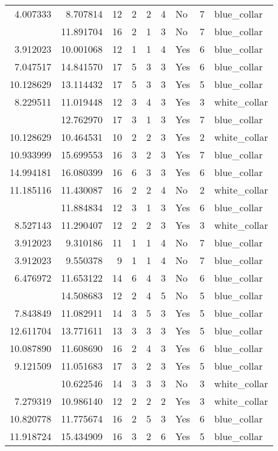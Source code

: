 \documentclass[
]{article}
\begin{document}
\begin{longtable}[t]{rrrrrllrl}
4.007333 & 8.707814 & 12 & 2 & 2 & 4 & No & 7 & blue\_collar\\
\addlinespace
3.912023 & 11.891704 & 16 & 2 & 1 & 3 & No & 7 & blue\_collar\\
3.912023 & 10.001068 & 12 & 1 & 1 & 4 & Yes & 6 & blue\_collar\\
7.047517 & 14.841570 & 17 & 5 & 3 & 3 & Yes & 6 & blue\_collar\\
10.128629 & 13.114432 & 17 & 5 & 3 & 3 & Yes & 5 & blue\_collar\\
8.229511 & 11.019448 & 12 & 3 & 4 & 3 & Yes & 3 & white\_collar\\
\addlinespace
3.912023 & 12.762970 & 17 & 3 & 1 & 3 & Yes & 7 & blue\_collar\\
10.128629 & 10.464531 & 10 & 2 & 2 & 3 & Yes & 2 & white\_collar\\
10.933999 & 15.699553 & 16 & 3 & 2 & 3 & Yes & 7 & blue\_collar\\
14.994181 & 16.080399 & 16 & 6 & 3 & 3 & Yes & 6 & blue\_collar\\
11.185116 & 11.430087 & 16 & 2 & 2 & 4 & No & 2 & white\_collar\\
\addlinespace
3.912023 & 11.884834 & 12 & 3 & 1 & 3 & Yes & 6 & blue\_collar\\
8.527143 & 11.290407 & 12 & 2 & 2 & 3 & Yes & 3 & white\_collar\\
3.912023 & 9.310186 & 11 & 1 & 1 & 4 & No & 7 & blue\_collar\\
3.912023 & 9.550378 & 9 & 1 & 1 & 4 & No & 7 & blue\_collar\\
6.476972 & 11.653122 & 14 & 6 & 4 & 3 & No & 6 & blue\_collar\\
\addlinespace
13.815561 & 14.508683 & 12 & 2 & 4 & 5 & No & 5 & blue\_collar\\
7.843849 & 11.082911 & 14 & 3 & 5 & 3 & Yes & 5 & blue\_collar\\
12.611704 & 13.771611 & 13 & 3 & 3 & 3 & Yes & 5 & blue\_collar\\
10.087890 & 11.608690 & 16 & 2 & 4 & 3 & Yes & 6 & blue\_collar\\
9.121509 & 11.051683 & 17 & 3 & 2 & 3 & Yes & 5 & blue\_collar\\
\addlinespace
7.130899 & 10.622546 & 14 & 3 & 3 & 3 & No & 3 & white\_collar\\
7.279319 & 10.986140 & 12 & 2 & 2 & 2 & Yes & 3 & white\_collar\\
10.820778 & 11.775674 & 16 & 2 & 5 & 3 & Yes & 6 & blue\_collar\\
11.918724 & 15.434909 & 16 & 3 & 2 & 6 & Yes & 5 & blue\_collar\\

\end{longtable}
\end{document}
